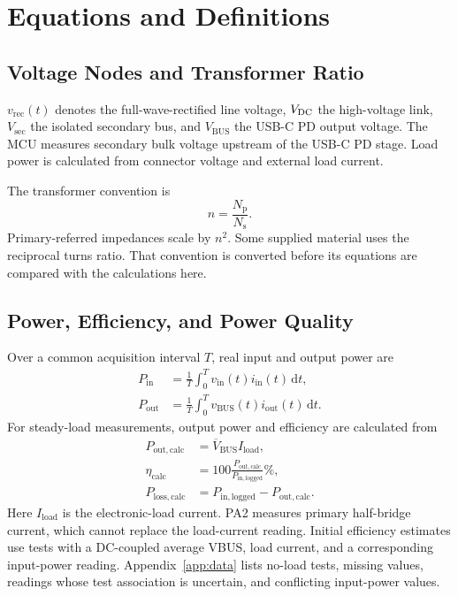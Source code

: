 \chapter{Equations and Definitions}
\label{app:equations}

\section{Voltage Nodes and Transformer Ratio}

\(v_{\mathrm{rec}}(t)\) denotes the full-wave-rectified line voltage, \(V_{\mathrm{DC}}\) the high-voltage link, \(V_{\mathrm{sec}}\) the isolated secondary bus, and \(V_{\mathrm{BUS}}\) the USB-C PD output voltage. The MCU measures secondary bulk voltage upstream of the USB-C PD stage. Load power is calculated from connector voltage and external load current.

The transformer convention is
\begin{equation}
n=\frac{N_{\mathrm{p}}}{N_{\mathrm{s}}}.
\label{eq:app-turns-ratio}
\end{equation}
Primary-referred impedances scale by \(n^2\). Some supplied material uses the reciprocal turns ratio. That convention is converted before its equations are compared with the calculations here.

\section{Power, Efficiency, and Power Quality}

Over a common acquisition interval \(T\), real input and output power are
\begin{align}
P_{\mathrm{in}}&=\frac{1}{T}\int_0^T v_{\mathrm{in}}(t)i_{\mathrm{in}}(t)\,\mathrm{d}t,\\
P_{\mathrm{out}}&=\frac{1}{T}\int_0^T v_{\mathrm{BUS}}(t)i_{\mathrm{out}}(t)\,\mathrm{d}t.
\end{align}
For steady-load measurements, output power and efficiency are calculated from
\begin{align}
P_{\mathrm{out,calc}}&=\overline{V}_{\mathrm{BUS}}I_{\mathrm{load}},\\
\eta_{\mathrm{calc}}&=100\frac{P_{\mathrm{out,calc}}}{P_{\mathrm{in,logged}}}\%,\\
P_{\mathrm{loss,calc}}&=P_{\mathrm{in,logged}}-P_{\mathrm{out,calc}}.
\end{align}
Here \(I_{\mathrm{load}}\) is the electronic-load current. PA2 measures primary half-bridge current, which cannot replace the load-current reading. Initial efficiency estimates use tests with a DC-coupled average VBUS, load current, and a corresponding input-power reading. Appendix~\ref{app:data} lists no-load tests, missing values, readings whose test association is uncertain, and conflicting input-power values.


